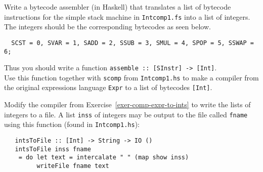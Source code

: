 \documentclass[a4paper]{article}
\begin{document}
\begin{exercise}\label{exer-comp-expr-to-ints}
 Write a bytecode assembler (in Haskell) that translates a list
  of bytecode instructions for the simple stack machine in
  \texttt{Intcomp1.fs} into a list of integers.  The integers should be
  the corresponding bytecodes as seen below.
  {\codesetup\begin{verbatim}
  SCST = 0, SVAR = 1, SADD = 2, SSUB = 3, SMUL = 4, SPOP = 5, SSWAP = 6;\end{verbatim}}
  \noindent 
  Thus you should write a function
  \texttt{assemble ::\ [SInstr] -> [Int]}.\\
  
  Use this function together with \texttt{scomp} from
  \texttt{Intcomp1.hs} to make a compiler from the original expressions
  language \texttt{Expr} to a list of bytecodes \texttt{[Int]}.
  
\end{exercise}


\begin{exercise}\label{exer-read-ints-into-stack-machine}
  Modify the compiler from Exercise~\ref{exer-comp-expr-to-ints} to
  write the lists of integers to a file.  A list \texttt{inss} of
  integers may be output to the file called \texttt{fname} using this
  function (found in \texttt{Intcomp1.hs}):

{\codesetup\begin{verbatim}
   intsToFile :: [Int] -> String -> IO ()
   intsToFile inss fname 
    = do let text = intercalate " " (map show inss)
         writeFile fname text
\end{verbatim}}

\end{exercise}
\end{document}
